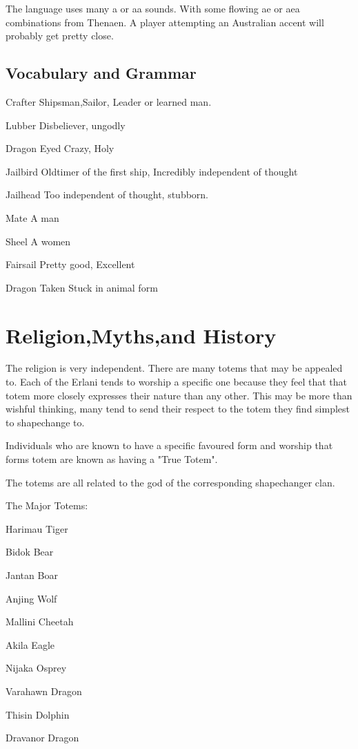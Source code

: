 The language uses many a or aa sounds. With some flowing ae or aea 
combinations from Thenaen. A player attempting an Australian accent 
will probably get pretty close.

\subsection{Vocabulary and Grammar}

\begin{relate}
        \item[Crafter]  Shipsman,Sailor, Leader or learned man.
        \item[Lubber] Disbeliever, ungodly
        \item[Dragon Eyed] Crazy, Holy
        \item[Jailbird] Oldtimer of the first ship, Incredibly independent
        of thought
        \item[Jailhead] Too independent of thought, stubborn.
        \item[Mate] A man
        \item[Sheel] A women
        \item[Fairsail] Pretty good, Excellent
        \item[Dragon Taken] Stuck in animal form
\end{relate}

\section{Religion,Myths,and History}

The religion is very independent. There are many totems that may be
appealed to. Each of the Erlani tends to worship a specific one
because they feel that that totem more closely expresses their nature
than any other. This may be more than wishful thinking, many tend to
send their respect to the totem they find simplest to shapechange to.

Individuals who are known to have a specific favoured form and
worship that forms totem are known as having a "True Totem".

The totems are all related to the god of the corresponding
shapechanger clan.

The Major Totems:

\begin{relate}
        \item[Harimau] Tiger
        \item[Bidok] Bear
        \item[Jantan] Boar
        \item[Anjing] Wolf
        \item[Mallini] Cheetah
        \item[Akila] Eagle
        \item[Nijaka] Osprey
        \item[Varahawn] Dragon
        \item[Thisin] Dolphin
        \item[Dravanor] Dragon 
\end{relate}


